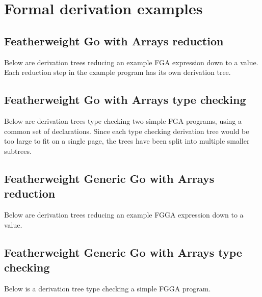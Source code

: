 \section{Formal derivation examples}

\subsection{Featherweight Go with Arrays reduction}
\label{sec:fg-derivation-example}

Below are derivation trees reducing an example FGA expression down to a value.
Each reduction step in the example program has its own derivation tree.



\subsection{Featherweight Go with Arrays type checking}
\label{sec:fg-typing-derivation-example}

Below are derivation trees type checking two simple FGA programs, using a common set
of declarations. Since each type checking derivation tree would be too large to
fit on a single page, the trees have been split into multiple smaller subtrees.



\subsection{Featherweight Generic Go with Arrays reduction}
\label{sec:fgg-derivation-example}

Below are derivation trees reducing an example FGGA expression down to a value.



\subsection{Featherweight Generic Go with Arrays type checking}
\label{sec:fgg-typing-derivation-example}

Below is a derivation tree type checking a simple FGGA program.



